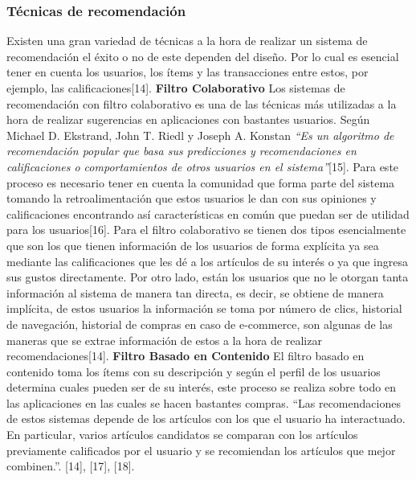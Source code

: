 \documentclass[12pt,letterpaper,openany]{book}
\begin{document}
\subsubsection{Técnicas de recomendación}
Existen una gran variedad de técnicas a la hora de realizar un sistema de recomendación el éxito o no de este dependen del diseño. Por lo cual es esencial tener en cuenta los usuarios, los ítems y las transacciones entre estos, por ejemplo, las calificaciones[14].
\vspace{5mm}\newline
\textbf{Filtro Colaborativo}\newline
Los sistemas de recomendación con filtro colaborativo es una de las técnicas más utilizadas a la hora de realizar sugerencias en aplicaciones con bastantes usuarios. Según Michael D. Ekstrand, John T. Riedl y Joseph A. Konstan \textit{“Es un algoritmo de recomendación popular que basa sus predicciones y recomendaciones en calificaciones o comportamientos de otros usuarios en el sistema”}[15]. Para este proceso es necesario tener en cuenta la comunidad que forma parte del sistema tomando la retroalimentación que estos usuarios le dan con sus opiniones y calificaciones encontrando así características en común que puedan ser de utilidad para los usuarios[16].
Para el filtro colaborativo se tienen dos tipos esencialmente que son los que tienen información de los usuarios de forma explícita ya sea mediante las calificaciones que les dé a los artículos de su interés o ya que ingresa sus gustos directamente. Por otro lado, están los usuarios que no le otorgan tanta información al sistema de manera tan directa, es decir, se obtiene de manera implícita, de estos usuarios la información se toma por número de clics, historial de navegación, historial de compras en caso de e-commerce, son algunas de las maneras que se extrae información de estos a la hora de realizar recomendaciones[14].
\vspace{5mm}\newline
\textbf{Filtro Basado en Contenido}\newline
El filtro basado en contenido toma los ítems con su descripción y según el perfil de los usuarios determina cuales pueden ser de su interés, este proceso se realiza sobre todo en las aplicaciones en las cuales se hacen bastantes compras. “Las recomendaciones de estos sistemas depende de los artículos con los que el usuario ha interactuado. En particular, varios artículos candidatos se comparan con los artículos previamente calificados por el usuario y se recomiendan los artículos que mejor combinen.”. [14], [17], [18].
\end{document}
